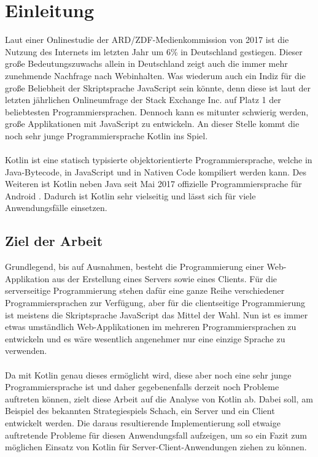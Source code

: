 
\chapter{Einleitung}
Laut einer Onlinestudie der ARD/ZDF-Medienkommission von 2017 \cite{onlineStudy2017,resultsOnlineStudy2017} ist die Nutzung des Internets im letzten Jahr um 6\% in Deutschland gestiegen. Dieser große Bedeutungszuwachs allein in Deutschland zeigt auch die immer mehr zunehmende Nachfrage nach Webinhalten. Was wiederum auch ein Indiz für die große Beliebheit der Skriptsprache JavaScript sein könnte, denn diese ist laut der letzten jährlichen Onlineumfrage der Stack Exchange Inc. \cite{developerSurvey2017} auf Platz 1 der beliebtesten Programmiersprachen. Dennoch kann es mitunter schwierig werden, große Applikationen mit JavaScript zu entwickeln. An dieser Stelle kommt die noch sehr junge Programmiersprache Kotlin ins Spiel.\\
\\
Kotlin ist eine statisch typisierte objektorientierte Programmiersprache, welche in Java-Bytecode, in JavaScript und in Nativen Code kompiliert werden kann. Des Weiteren ist Kotlin neben Java seit Mai 2017 offizielle Programmiersprache für Android \cite{kotlinAndroidOfficial}. Dadurch ist Kotlin sehr vielseitig und lässt sich für viele Anwendungsfälle einsetzen.

\section{Ziel der Arbeit}
Grundlegend, bis auf Ausnahmen, besteht die Programmierung einer Web-Applikation aus der Erstellung eines Servers sowie eines Clients. Für die serverseitige Programmierung stehen dafür eine ganze Reihe verschiedener Programmiersprachen zur Verfügung, aber für die clientseitige Programmierung ist meistens die Skriptsprache JavaScript das Mittel der Wahl. Nun ist es immer etwas umständlich Web-Applikationen im mehreren Programmiersprachen zu entwickeln und es wäre wesentlich angenehmer nur eine einzige Sprache zu verwenden.\\
\\
Da mit Kotlin genau dieses ermöglicht wird, diese aber noch eine sehr junge Programmiersprache ist und daher gegebenenfalls derzeit noch Probleme auftreten können, zielt diese Arbeit auf die Analyse von Kotlin ab. Dabei soll, am Beispiel des bekannten Strategiespiels Schach, ein Server und ein Client entwickelt werden. Die daraus resultierende Implementierung soll etwaige auftretende Probleme für diesen Anwendungsfall aufzeigen, um so ein Fazit zum möglichen Einsatz von Kotlin für Server-Client-Anwendungen ziehen zu können.

